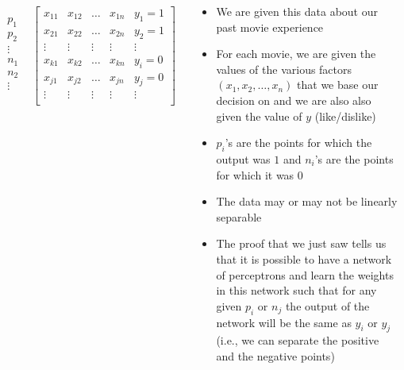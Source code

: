 \begin{frame}
	\begin{columns}
		\begin{overlayarea}{\textwidth}{\textheight}
			\onslide<5->{
			\begin{center}
				
			\end{center}}
			\begin{align*}
				\begin{array}{c} p_1 \\ p_2 \\ \vdots \\ n_1 \\ n_2 \\ \vdots\\ \end{array} &
				\begin{bmatrix}
					x_{11} & x_{12} & \dots  & x_{1n} & y_1=1  \\
					x_{21} & x_{22} & \dots  & x_{2n} & y_2=1  \\
					\vdots & \vdots & \vdots & \vdots & \vdots \\
					x_{k1} & x_{k2} & \dots  & x_{kn} & y_i=0  \\
					x_{j1} & x_{j2} & \dots  & x_{jn} & y_j=0  \\
					\vdots & \vdots & \vdots & \vdots & \vdots \\
				\end{bmatrix}
			\end{align*}
		\end{overlayarea}
		\begin{overlayarea}{\textwidth}{\textheight}
			\begin{itemize}\justifying
				\item<1-> We are given this data about our past movie experience
				\item<2->For each movie, we are given the values of the various factors $(x_1, x_2,\dots, x_n)$ that we base our decision on and we are also also given the value of $y$ (like/dislike)
				\item<3-> $p_i$'s are the points for which the output was $1$ and $n_i$'s are the points for which it was $0$
				\item<4->The data may or may not be linearly separable
				\item<5-> The proof that we just saw tells us that it is possible to have a network of perceptrons and learn the weights in this network such that for any given $p_i$ or $n_j$ the output of the network will be the same as $y_i$ or $y_j$ (i.e., we can separate the positive and the negative points)
			\end{itemize}
		\end{overlayarea}
	\end{columns}
\end{frame}

